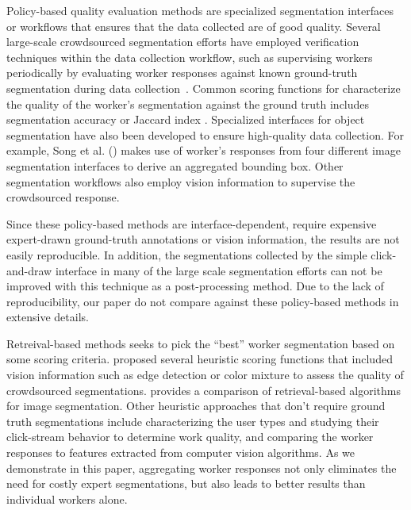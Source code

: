 Policy-based quality evaluation methods are specialized segmentation interfaces or workflows that ensures that the data collected are of good quality. Several large-scale crowdsourced segmentation efforts have employed verification techniques within the data collection workflow, such as supervising workers periodically by evaluating worker responses against known ground-truth segmentation during data collection~\cite{Lin2014,Everingham15}. Common scoring functions for characterize the quality of the worker's segmentation against the ground truth includes segmentation accuracy\cite{Everingham15} or Jaccard index \cite{Sameki2015,Gurari2016}. Specialized interfaces for object segmentation have also been developed to ensure high-quality data collection. For example, Song et al. (\citeyear{Song2018}) makes use of worker's responses from four different image segmentation interfaces to derive an aggregated bounding box. Other segmentation workflows also employ vision information to supervise the crowdsourced response\cite{Russakovsky2015,Gurari2016}. 
\par Since these policy-based methods are interface-dependent, require expensive expert-drawn ground-truth annotations or vision information, the results are not easily reproducible. In addition, the segmentations collected by the simple click-and-draw interface in many of the large scale segmentation efforts can not be improved with this technique as a post-processing method. Due to the lack of reproducibility, our paper do not compare against these policy-based methods in extensive details.

Retreival-based methods seeks to pick the ``best'' worker segmentation based on some scoring criteria. \cite{Vittayakorn2011} proposed several heuristic scoring functions that included vision information such as edge detection or color mixture to assess the quality of crowdsourced segmentations.
\cite{Vittayakorn2011} provides a comparison of retrieval-based algorithms for image segmentation. 
Other heuristic approaches that don't require ground truth segmentations include characterizing the user types and studying their click-stream behavior to determine work quality\cite{Cabezas2015,Sameki2015,Sorokin2008}, and comparing the worker responses to features extracted from computer vision algorithms\cite{Vittayakorn2011,Russakovsky2015}. As we demonstrate in this paper, aggregating worker responses not only eliminates the need for costly expert segmentations, but also leads to better results than individual workers alone.


